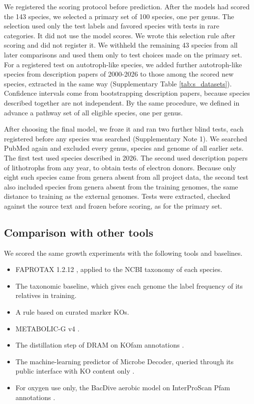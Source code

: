 \documentclass[10pt,a4paper,onecolumn]{article}
\providecommand{\tightlist}{%
  \setlength{\itemsep}{0pt}\setlength{\parskip}{0pt}}
\begin{document}
We registered the scoring protocol before prediction. After the models
had scored the 143 species, we selected a primary set of 100 species,
one per genus. The selection used only the test labels and favored
species with tests in rare categories. It did not use the model scores.
We wrote this selection rule after scoring and did not register it. We
withheld the remaining 43 species from all later comparisons and used
them only to test choices made on the primary set. For a registered test
on autotroph-like species, we added further autotroph-like species from
description papers of 2000-2026 to those among the scored new species,
extracted in the same way (Supplementary Table \ref{tab:s_datasets}).
Confidence intervals come from bootstrapping description papers, because
species described together are not independent. By the same procedure,
we defined in advance a pathway set of all eligible species, one per
genus.

After choosing the final model, we froze it and ran two further blind
tests, each registered before any species was searched (Supplementary
Note 1). We searched PubMed again and excluded every genus, species and
genome of all earlier sets. The first test used species described in
2026. The second used description papers of lithotrophs from any year,
to obtain tests of electron donors. Because only eight such species came
from genera absent from all project data, the second test also included
species from genera absent from the training genomes, the same distance
to training as the external genomes. Tests were extracted, checked
against the source text and frozen before scoring, as for the primary
set.

\subsection{Comparison with other
tools}\label{comparison-with-other-tools}

We scored the same growth experiments with the following tools and
baselines.

\begin{itemize}
\tightlist
\item
  FAPROTAX 1.2.12 \autocite{Louca2016}, applied to the NCBI taxonomy of
  each species.
\item
  The taxonomic baseline, which gives each genome the label frequency of
  its relatives in training.
\item
  A rule based on curated marker KOs.
\item
  METABOLIC-G v4 \autocite{Zhou2022}.
\item
  The distillation step of DRAM on KOfam annotations
  \autocite{Shaffer2020}.
\item
  The machine-learning predictor of Microbe Decoder, queried through its
  public interface with KO content only \autocite{Hackmann2026}.
\item
  For oxygen use only, the BacDive aerobic model on InterProScan Pfam
  annotations \autocite{Koblitz2025,Jones2014}.
\end{itemize}
\end{document}
